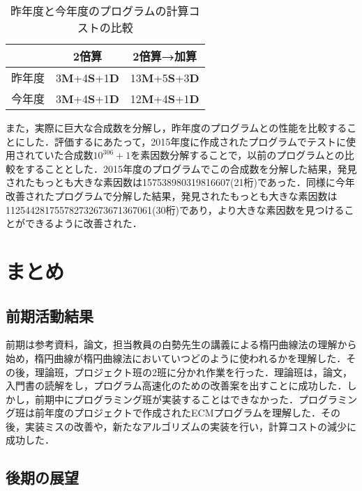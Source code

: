 \documentclass[openany,11pt,papersize]{jsbook}
\begin{document}
\begin{table}
\begin{center}
\caption{昨年度と今年度のプログラムの計算コストの比較}\label{tab:cost}
\begin{tabular}{ccc}
\hline
& 2倍算 & 2倍算→加算\\
\hline
昨年度 & 3{\bf M}+4{\bf S}+1{\bf D}\footnotemark & 13{\bf M}+5{\bf S}+3{\bf D}\\
今年度 & 3{\bf M}+4{\bf S}+1{\bf D} & 12{\bf M}+4{\bf S}+1{\bf D}\\
\hline
\end{tabular}
\end{center}
\end{table}

また，実際に巨大な合成数を分解し，昨年度のプログラムとの性能を比較することにした．評価するにあたって，2015年度に作成されたプログラムでテストに使用されていた合成数$10^{306}+1$を素因数分解することで，以前のプログラムとの比較をすることとした．2015年度のプログラムでこの合成数を分解した結果，発見されたもっとも大きな素因数は157538980319816607(21桁)であった．同様に今年改善されたプログラムで分解した結果，発見されたもっとも大きな素因数は112544281755782732673671367061(30桁)であり，より大きな素因数を見つけることができるように改善された．


\chapter{まとめ}

\section{前期活動結果}

前期は参考資料，論文，担当教員の白勢先生の講義による楕円曲線法の理解から始め，楕円曲線が楕円曲線法においていつどのように使われるかを理解した．その後，理論班，プロジェクト班の2班に分かれ作業を行った．理論班は，論文，入門書の読解をし，プログラム高速化のための改善案を出すことに成功した．しかし，前期中にプログラミング班が実装することはできなかった．プログラミング班は前年度のプロジェクトで作成されたECMプログラムを理解した．その後，実装ミスの改善や，新たなアルゴリズムの実装を行い，計算コストの減少に成功した．


\section{後期の展望}
\end{document}
